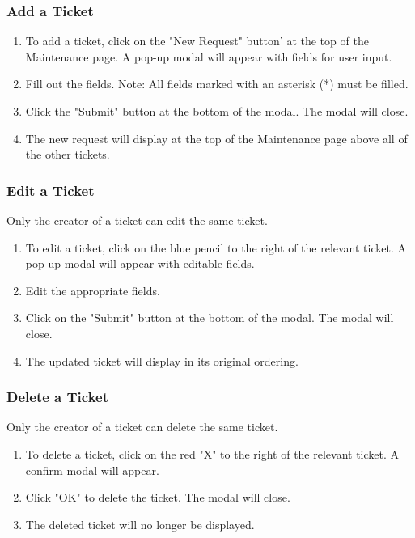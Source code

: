\documentclass[12pt]{article}
\begin{document}
\subsubsection{Add a Ticket}
\begin{enumerate}
\item To add a ticket, click on the "New Request" button' at the top of the Maintenance page. A pop-up modal will appear with fields for user input.
\item Fill out the fields. Note: All fields marked with an asterisk (*) must be filled.
\item Click the "Submit" button at the bottom of the modal. The modal will close.
\item The new request will display at the top of the Maintenance page above all of the other tickets.
\end{enumerate}

\subsubsection{Edit a Ticket}
Only the creator of a ticket can edit the same ticket. 
\begin{enumerate}
\item To edit a ticket, click on the blue pencil to the right of the relevant ticket. A pop-up modal will appear with editable fields.
\item Edit the appropriate fields.
\item Click on the "Submit" button at the bottom of the modal. The modal will close.
\item The updated ticket will display in its original ordering.
\end{enumerate}

\subsubsection{Delete a Ticket}
Only the creator of a ticket can delete the same ticket. 
\begin{enumerate}
\item To delete a ticket, click on the red "X" to the right of the relevant ticket. A confirm modal will appear.
\item Click "OK" to delete the ticket. The modal will close.
\item The deleted ticket will no longer be displayed.
\end{enumerate}
\end{document}
